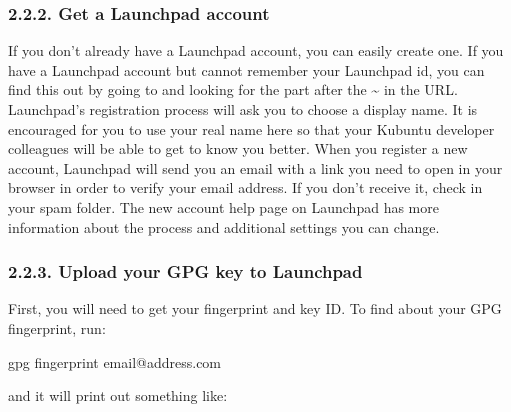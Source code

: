 \documentclass[letterpaper,10pt,english]{sphinxmanual}
\begin{document}
\subsubsection{2.2.2. Get a Launchpad account}
\label{\detokenize{docs/packaging-guide/getting-started:get-a-launchpad-account}}
\sphinxAtStartPar
If you don’t already have a Launchpad account, you can easily create one. If you have a Launchpad account but cannot remember your Launchpad id, you can find this out by going to  and looking for the part after the \textasciitilde{} in the URL.
Launchpad’s registration process will ask you to choose a display name. It is encouraged for you to use your real name here so that your Kubuntu developer colleagues will be able to get to know you better.
When you register a new account, Launchpad will send you an email with a link you need to open in your browser in order to verify your email address. If you don’t receive it, check in your spam folder.
The new account help page on Launchpad has more information about the process and additional settings you can change.


\subsubsection{2.2.3. Upload your GPG key to Launchpad}
\label{\detokenize{docs/packaging-guide/getting-started:upload-your-gpg-key-to-launchpad}}
\sphinxAtStartPar
First, you will need to get your fingerprint and key ID.
To find about your GPG fingerprint, run:

\begin{sphinxVerbatim}[commandchars=\\\{\}]
\PYGZdl{} gpg \PYGZhy{}\PYGZhy{}fingerprint email@address.com
\end{sphinxVerbatim}

\sphinxAtStartPar
and it will print out something like:

\begin{sphinxVerbatim}[commandchars=\\\{\}]
    
                   
     
    
\end{sphinxVerbatim}
\end{document}
